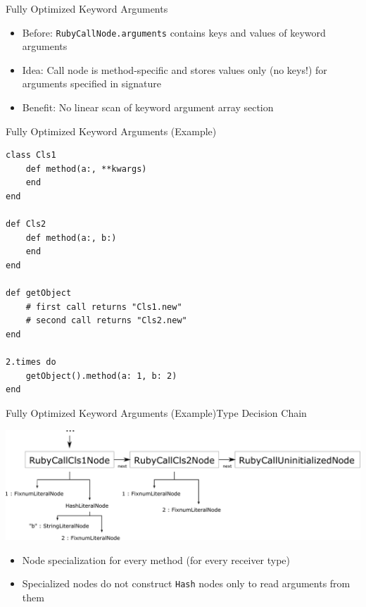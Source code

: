 \documentclass[xcolor=dvipsname,handout]{beamer} %
\begin{document}
\begin{frame}{Fully Optimized Keyword Arguments}
\begin{itemize}
    \item Before: \lstinline{RubyCallNode.arguments} contains keys and values of keyword arguments
    \item Idea: Call node is method-specific and stores values only (no keys!) for arguments specified in signature
    \item Benefit: No linear scan of keyword argument array section
\end{itemize}
\end{frame}

\begin{frame}[fragile]{Fully Optimized Keyword Arguments (Example)}
\begin{lstlisting}
class Cls1
    def method(a:, **kwargs)
    end
end

def Cls2
    def method(a:, b:)
    end
end

def getObject
    # first call returns "Cls1.new"
    # second call returns "Cls2.new"
end

2.times do
    getObject().method(a: 1, b: 2)
end
\end{lstlisting}
\end{frame}

\begin{frame}{Fully Optimized Keyword Arguments (Example)}{Type Decision Chain}
\begin{table}
    \centering
    \includegraphics[width=\textwidth]{fully_opt.pdf}
\end{table}

\begin{itemize}
    \item Node specialization for every method (for every receiver type)
    \item Specialized nodes do not construct \lstinline{Hash} nodes only to read arguments from them
\end{itemize}
\end{frame}
\end{document}
